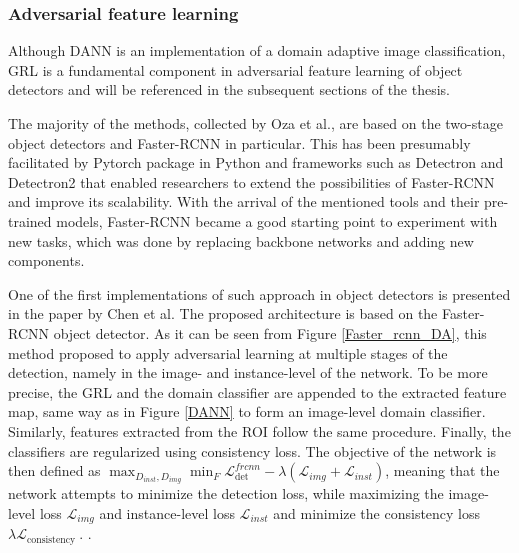 \documentclass[english, 12pt, a4paper, elec, utf8, a-1b, online]{aaltothesis}
\begin{document}
\subsubsection{Adversarial feature learning}
\label{adv_approach} 

Although DANN is an implementation of a domain adaptive image classification, GRL is a fundamental component in adversarial feature learning of object detectors and will be referenced in the subsequent sections of the thesis. 

The majority of the methods, collected by Oza et al.\cite{Oza2021}, are based on the two-stage object detectors and Faster-RCNN \cite{ima} in particular. This has been presumably facilitated by Pytorch \cite{NEURIPS2019_9015} package in Python and frameworks such as Detectron \cite{Detectron2018} and Detectron2 \cite{wu2019detectron2} that enabled researchers to extend the possibilities of Faster-RCNN and improve its scalability. With the arrival of the mentioned tools and their pre-trained models, Faster-RCNN became a good starting point to experiment with new tasks, which was done by replacing backbone networks and adding new components. 

One of the first implementations of such approach in object detectors is presented in the paper by Chen et al\cite{Chen2018}. The proposed architecture is based on the Faster-RCNN object detector. As it can be seen from Figure \ref{Faster_rcnn_DA}, this method proposed to apply adversarial learning at multiple stages of the detection, namely in the image- and instance-level of the network. To be more precise, the GRL and the domain classifier are appended to the extracted feature map, same way as in Figure \ref{DANN} to form an image-level domain classifier. Similarly, features extracted from the ROI follow the same procedure. Finally, the classifiers are regularized using consistency loss.   
The objective of the network is then defined as $\max _{D_{inst}, D_{img}} \min _{F} \mathcal{L}_{\text {det }}^{frcnn}-\lambda\left(\mathcal{L}_{i m g}+\mathcal{L}_{inst}\right)$, meaning that the network attempts to minimize the detection loss, while maximizing the image-level loss $\mathcal{L}_{img}$ and instance-level loss $\mathcal{L}_{inst}$ and minimize the consistency loss $\lambda \mathcal{L}_{\text {consistency }}$. \cite{Chen2018}.
\end{document}
